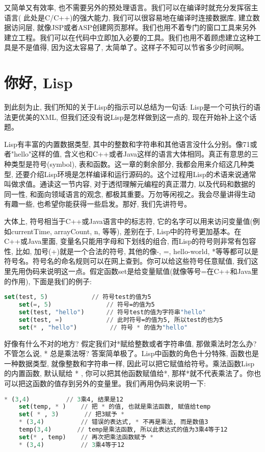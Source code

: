\documentclass[10pt]{article}
\begin{document}
又简单又有效率, 也不需要另外的预处理语言。我们可以在编译时就充分发挥宿主语言( 此处是C/C++)的强大能力, 我们可以很容易地在编译时连接数据库, 建立数据访问层, 就像JSP或者ASP创建网页那样。我们也用不着专门的窗口工具来另外建立工程。我们可以在代码中立即加入必要的工具。我们也用不着顾虑建立这种工具是不是值得, 因为这太容易了, 太简单了。这样子不知可以节省多少时间啊。
\section{你好, Lisp}
\label{sec-7}

到此刻为止, 我们所知的关于Lisp的指示可以总结为一句话: Lisp是一个可执行的语法更优美的XML, 但我们还没有说Lisp是怎样做到这一点的, 现在开始补上这个话题。 

Lisp有丰富的内置数据类型, 其中的整数和字符串和其他语言没什么分别。像71或者"hello"这样的值, 含义也和C++或者Java这样的语言大体相同。真正有意思的三种类型是符号(symbol), 表和函数。这一章的剩余部分, 我都会用来介绍这几种类型, 还要介绍Lisp环境是怎样编译和运行源码的。这个过程用Lisp的术语来说通常叫做求值。通读这一节内容, 对于透彻理解元编程的真正潜力, 以及代码和数据的同一性, 和面向领域语言的观念, 都极其重要。万勿等闲视之。我会尽量讲得生动有趣一些, 也希望你能获得一些启发。那好, 我们先讲符号。

大体上, 符号相当于C++或Java语言中的标志符, 它的名字可以用来访问变量值(例如currentTime, arrayCount, n, 等等), 差别在于, Lisp中的符号更加基本。在C++或Java里面, 变量名只能用字母和下划线的组合, 而Lisp的符号则非常有包容性, 比如, 加号(+)就是一个合法的符号, 其他的像-, =, hello-world, *等等都可以是符号名。符号名的命名规则可以在网上查到。你可以给这些符号任意赋值, 我们这里先用伪码来说明这一点。假定函数set是给变量赋值(就像等号=在C++和Java里的作用), 下面是我们的例子:
\begin{lstlisting}[language=lisp]
    set(test, 5)            // 符号test的值为5
    set(=, 5)               // 符号=的值为5
    set(test, "hello")      // 符号test的值为字符串"hello"
    set(test, =)            // 此时符号=的值为5, 所以test的也为5
    set(* , "hello")         // 符号 * 的值为"hello"
\end{lstlisting}

好像有什么不对的地方? 假定我们对*赋给整数或者字符串值, 那做乘法时怎么办? 不管怎么说, * 总是乘法呀? 答案简单极了。Lisp中函数的角色十分特殊, 函数也是一种数据类型, 就像整数和字符串一样, 因此可以把它赋值给符号。乘法函数Lisp的内置函数, 默认赋给 * , 你可以把其他函数赋值给*, 那样*就不代表乘法了。你也可以把这函数的值存到另外的变量里。我们再用伪码来说明一下:
\begin{lstlisting}[language=lisp]
    * (3,4)          // 3乘4, 结果是12
    set(temp, * )    // 把 * 的值, 也就是乘法函数, 赋值给temp
    set( * , 3)       // 把3赋予 *
    * (3,4)          // 错误的表达式, * 不再是乘法, 而是数值3
    temp(3,4)       // temp是乘法函数, 所以此表达式的值为3乘4等于12
    set(* , temp)    // 再次把乘法函数赋予 *
    * (3,4)          // 3乘4等于12
\end{lstlisting}
\end{document}
